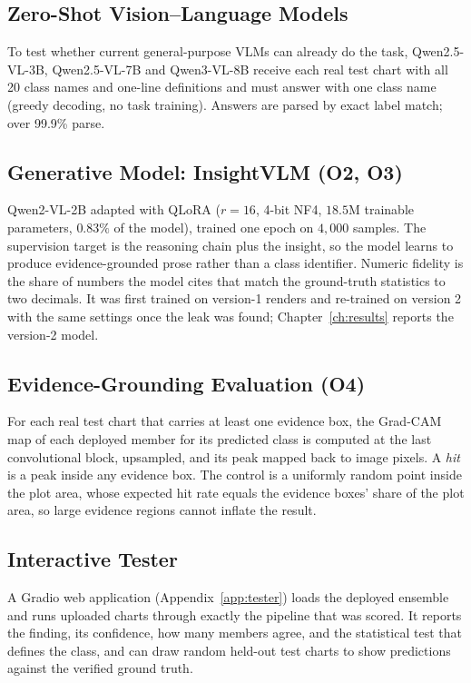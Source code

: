 \subsection{Zero-Shot Vision--Language Models}

To test whether current general-purpose VLMs can already do the task, Qwen2.5-VL-3B,
Qwen2.5-VL-7B and Qwen3-VL-8B receive each real test chart with all 20 class names and
one-line definitions and must answer with one class name (greedy decoding, no task
training). Answers are parsed by exact label match; over 99.9\% parse.

\subsection{Generative Model: InsightVLM (O2, O3)}

Qwen2-VL-2B adapted with QLoRA ($r=16$, 4-bit NF4, $18.5$M trainable parameters,
$0.83\%$ of the model), trained one epoch on $4{,}000$ samples. The supervision
target is the reasoning chain plus the insight, so the model learns to produce
evidence-grounded prose rather than a class identifier. Numeric fidelity is the share
of numbers the model cites that match the ground-truth statistics to two decimals.
It was first trained on version-1 renders and re-trained on version 2 with the same
settings once the leak was found; Chapter~\ref{ch:results} reports the version-2 model.

\subsection{Evidence-Grounding Evaluation (O4)}

For each real test chart that carries at least one evidence box, the Grad-CAM map of
each deployed member for its predicted class is computed at the last convolutional
block, upsampled, and its peak mapped back to image pixels. A \emph{hit} is a peak
inside any evidence box. The control is a uniformly random point inside the plot area,
whose expected hit rate equals the evidence boxes' share of the plot area, so large
evidence regions cannot inflate the result.

\subsection{Interactive Tester}

A Gradio web application (Appendix~\ref{app:tester}) loads the deployed ensemble and
runs uploaded charts through exactly the pipeline that was scored. It reports the
finding, its confidence, how many members agree, and the statistical test that defines
the class, and can draw random held-out test charts to show predictions against the
verified ground truth.


